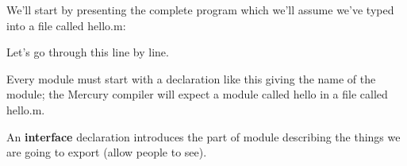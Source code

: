 \documentclass[a4paper,11pt,notitlepage,onecolumn]{book}
\begin{document}
We'll start by presenting the complete program which we'll assume we've
typed into a file called \textsf{hello.m}:
\begin{small}

\begin{ptabular}
\nextline
{}
\nextline
{}
\nextline
{}
\nextline
{}
\nextline
{}
\nextline
{}
\nextline
\end{ptabular}

\end{small}
Let's go through this line by line.
\begin{small}

\begin{ptabular}
\nextline
\end{ptabular}

\end{small}
Every module must start with a declaration like this giving the name of the
module; the Mercury compiler will expect a module called \textsf{hello} in
a file called \textsf{hello.m}.
\begin{small}

\begin{ptabular}
\nextline
\end{ptabular}

\end{small}
An \textsf{\textbf{interface}} declaration introduces the part of module describing the
things we are going to export (\ie allow people to see).
\begin{small}

\begin{ptabular}
\nextline
\end{ptabular}

\end{small}
\end{document}
